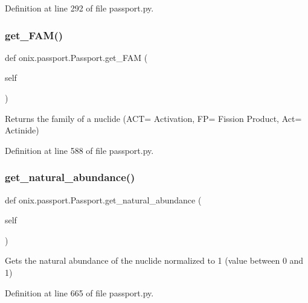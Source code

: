Definition at line 292 of file passport.\+py.

\mbox{\label{classonix_1_1passport_1_1Passport_a72fa224dd0f81db282c5051f8d1fe180}} 
\subsubsection{\texorpdfstring{get\+\_\+\+F\+A\+M()}{get\_FAM()}}
{\footnotesize\ttfamily def onix.\+passport.\+Passport.\+get\+\_\+\+F\+AM (\begin{DoxyParamCaption}\item[{}]{self }\end{DoxyParamCaption})}

\begin{DoxyVerb}Returns the family of a nuclide (ACT= Activation, FP= Fission Product, Act= Actinide)\end{DoxyVerb}
 

Definition at line 588 of file passport.\+py.

\mbox{\label{classonix_1_1passport_1_1Passport_a02bd09ea9475cf3e6c8d29fe504a92f9}} 
\subsubsection{\texorpdfstring{get\+\_\+natural\+\_\+abundance()}{get\_natural\_abundance()}}
{\footnotesize\ttfamily def onix.\+passport.\+Passport.\+get\+\_\+natural\+\_\+abundance (\begin{DoxyParamCaption}\item[{}]{self }\end{DoxyParamCaption})}

\begin{DoxyVerb}Gets the natural abundance of the nuclide normalized to 1 (value between 0 and 1)\end{DoxyVerb}
 

Definition at line 665 of file passport.\+py.

